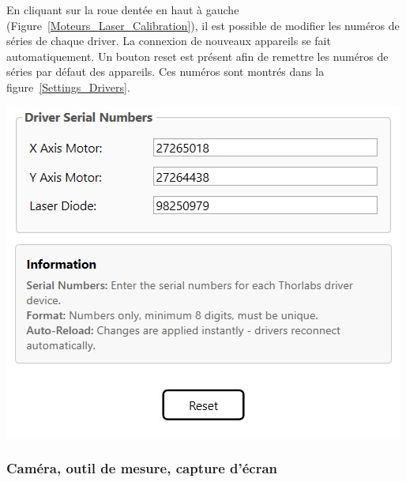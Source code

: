 \begin{minipage}[c]{0.4\textwidth}
    En cliquant sur la roue dentée en haut à gauche (Figure~\ref{Moteurs_Laser_Calibration}), il est possible de modifier les numéros de séries de chaque driver. La connexion de nouveaux appareils se fait automatiquement. Un bouton reset est présent afin de remettre les numéros de séries par défaut des appareils. Ces numéros sont montrés dans la figure~\ref{Settings_Drivers}.
\end{minipage}
\begin{minipage}[c]{0.58\textwidth}
    \begin{center}
        \includegraphics[width=\textwidth]{assets/figures/Application_ServoVision/Settings_Drivers.png}
    \end{center}
    \label{Settings_Drivers}
\end{minipage}

\subsubsection{Caméra, outil de mesure, capture d'écran}

